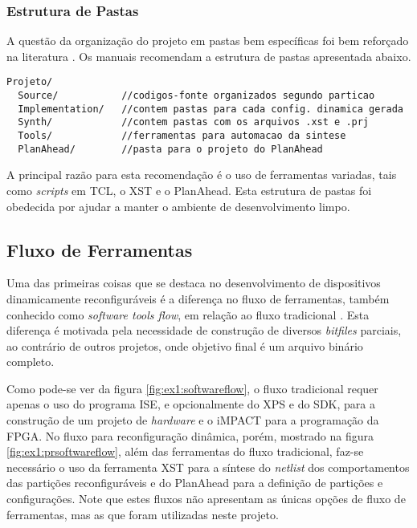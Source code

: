 \documentclass[11pt,a4paper,oneside]{book}
\begin{document}
\subsubsection{Estrutura de Pastas}
A questão da organização do projeto em pastas bem específicas foi bem reforçado na literatura \cite{ug702, ug743, ug744}.
Os manuais recomendam a estrutura de pastas apresentada abaixo.
\begin{lstlisting}
Projeto/
  Source/           //codigos-fonte organizados segundo particao
  Implementation/   //contem pastas para cada config. dinamica gerada
  Synth/            //contem pastas com os arquivos .xst e .prj
  Tools/            //ferramentas para automacao da sintese
  PlanAhead/        //pasta para o projeto do PlanAhead
\end{lstlisting}
A principal razão para esta recomendação é o uso de ferramentas variadas, tais como \textit{scripts} em TCL, o XST e o PlanAhead.
Esta estrutura de pastas foi obedecida por ajudar a manter o ambiente de desenvolvimento limpo.

\subsection{Fluxo de Ferramentas}
Uma das primeiras coisas que se destaca no desenvolvimento de dispositivos dinamicamente reconfiguráveis é a diferença no fluxo de ferramentas, também conhecido como \textit{software tools flow}, em relação ao fluxo tradicional \cite{ug743}.
Esta diferença é motivada pela necessidade de construção de diversos \textit{bitfiles} parciais, ao contrário de outros projetos, onde objetivo final é um arquivo binário completo.

Como pode-se ver da figura \ref{fig:ex1:softwareflow}, o fluxo tradicional requer apenas o uso do programa ISE, e opcionalmente do XPS e do SDK, para a construção de um projeto de \textit{hardware} e o iMPACT para a programação da FPGA.
No fluxo para reconfiguração dinâmica, porém, mostrado na figura \ref{fig:ex1:prsoftwareflow}, além das ferramentas do fluxo tradicional, faz-se necessário o uso da ferramenta XST para a síntese do \textit{netlist} dos comportamentos das partições reconfiguráveis e do PlanAhead para a definição de partições e configurações.
Note que estes fluxos não apresentam as únicas opções de fluxo de ferramentas, mas as que foram utilizadas neste projeto.
\end{document}
